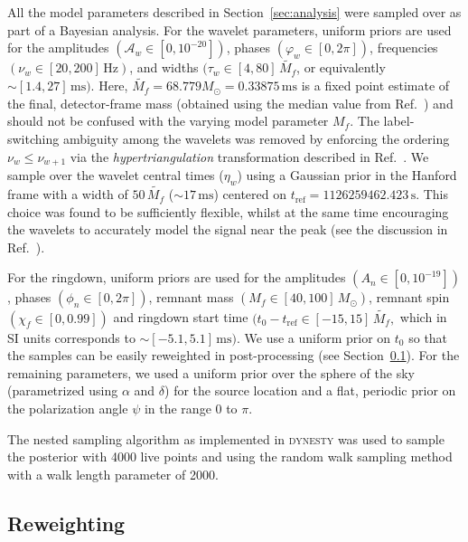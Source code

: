 All the model parameters described in Section~\ref{sec:analysis} were sampled over as part of a Bayesian analysis.
For the wavelet parameters, uniform priors are used for the amplitudes $(\mathcal{A}_w \in [0,10^{-20}])$, phases $(\varphi_w \in [0,2\pi])$, frequencies $(\nu_w \in [20,200]\, \mathrm{Hz})$, and widths $(\tau_w \in [4,80]\, \tilde{M_f}$, or equivalently $\sim[1.4,27]\, \mathrm{ms})$.
Here, $\tilde{M_f}=68.779M_\odot=0.33875\,\mathrm{ms}$ is a fixed point estimate of the final, detector-frame mass (obtained using the median value from Ref.~\cite{LIGOScientific:2018mvr}) and should not be confused with the varying model parameter $M_f$.
The label-switching ambiguity among the wavelets was removed by enforcing the ordering 
$ \nu_w \leq \nu_{w+1} $ via the \emph{hypertriangulation} transformation described in Ref.~\cite{Buscicchio:2019rir}.
We sample over the wavelet central times ($\eta_w$) using a Gaussian prior in the Hanford frame with a width of $50\,\tilde{M_f}$ ($\sim 17\,\mathrm{ms}$) centered on $t_\mathrm{ref} = 1126259462.423\,\mathrm{s}$.
This choice was found to be sufficiently flexible, whilst at the same time encouraging the wavelets to accurately model the signal near the peak (see the discussion in Ref.~\cite{Finch:2021qph}).

For the ringdown, uniform priors are used for the amplitudes $(A_n \in [0,10^{-19}])$, phases $(\phi_n \in [0,2\pi])$, remnant mass $(M_f \in [40,100]\,M_\odot )$, remnant spin $(\chi_f \in [0,0.99])$ and ringdown start time $(t_0-t_\mathrm{ref} \in [-15, 15]\,\tilde{M_f},$ which in SI units corresponds to $\sim[-5.1,5.1]\, \mathrm{ms})$.
We use a uniform prior on $t_0$ so that the samples can be easily reweighted in post-processing (see Section~\ref{subsec:reweighting}). 
For the remaining parameters, we used a uniform prior over the sphere of the sky (parametrized using $\alpha$ and $\delta$) for the source location and a flat, periodic prior on the polarization angle $\psi$ in the range $0$ to $\pi$.

The nested sampling \cite{Skilling:2006gxv} algorithm as implemented in \textsc{dynesty} \cite{Speagle:2019ivv} was used to sample the posterior with 4000 live points and using the random walk sampling method with a walk length parameter of 2000.


\subsection{Reweighting} \label{subsec:reweighting}

